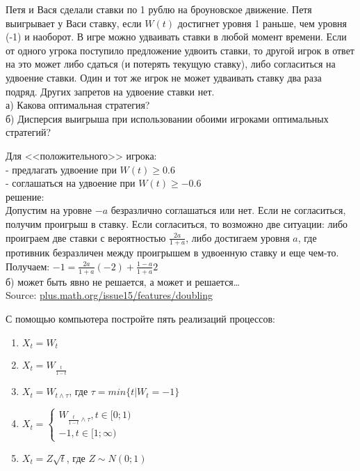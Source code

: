\begin{problem}
Петя и Вася сделали ставки по 1 рублю на броуновское движение. Петя выигрывает у Васи ставку, если $W(t)$ достигнет уровня 1 раньше, чем уровня (-1) и наоборот. В игре можно удваивать ставки в любой момент времени. Если от одного угрока поступило предложение удвоить ставки, то другой игрок в ответ на это может либо сдаться (и потерять текущую ставку), либо согласиться на удвоение ставки. Один и тот же игрок не может удваивать ставку два раза подряд. Других запретов на удвоение ставки нет. \\
а) Какова оптимальная стратегия?\\
б) Дисперсия выигрыша при использовании обоими игроками оптимальных стратегий? \\


\begin{sol}
Для <<положительного>> игрока: \\
- предлагать удвоение при $W(t)\geq 0.6$ \\
- соглашаться на удвоение при $W(t)\geq -0.6$ \\
решение: \\
Допустим на уровне $-a$ безразлично соглашаться или нет. Если не согласиться, получим проигрыш в ставку. Если согласиться, то возможно две ситуации: либо проиграем две ставки с вероятностью $\frac{2a}{1+a}$, либо достигаем уровня $a$, где противник безразличен между проигрышем в удвоенную ставку и еще чем-то. \\
Получаем: $-1=\frac{2a}{1+a}(-2)+\frac{1-a}{1+a}2$ \\
б) может быть явно не решается, а может и решается\ldots\\
Source: \url{plus.math.org/issue15/features/doubling}
\end{sol}
\end{problem}

\begin{problem}
С помощью компьютера постройте пять реализаций процессов:
\begin{enumerate}
\item $X_{t}=W_{t}$
\item $X_{t}=W_{\frac{t}{1-t}}$
\item $X_{t}=W_{t\wedge \tau}$, где $\tau=min\{t|W_{t}=-1\}$
\item $X_{t}=
\begin{cases}
W_{\frac{t}{1-t}\wedge\tau}, t\in [0;1) \\
-1, t\in[1;\infty)
\end{cases}$
\item $X_{t}=Z\sqrt{t}$, где $Z\sim N(0;1)$
\end{enumerate}

\begin{sol}

\end{sol}
\end{problem}

